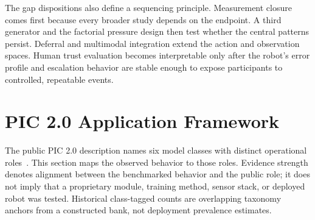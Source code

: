 \documentclass[conference]{IEEEtran}
\begin{document}
The gap dispositions also define a sequencing principle. Measurement closure comes first because every broader study depends on the endpoint. A third generator and the factorial pressure design then test whether the central patterns persist. Deferral and multimodal integration extend the action and observation spaces. Human trust evaluation becomes interpretable only after the robot's error profile and escalation behavior are stable enough to expose participants to controlled, repeatable events.

\section{PIC 2.0 Application Framework}
\label{sec:pic}

The public PIC 2.0 description names six model classes with distinct operational roles~\cite{ingen2026origami}. This section maps the observed behavior to those roles. Evidence strength denotes alignment between the benchmarked behavior and the public role; it does not imply that a proprietary module, training method, sensor stack, or deployed robot was tested. Historical class-tagged counts are overlapping taxonomy anchors from a constructed bank, not deployment prevalence estimates.
\end{document}
